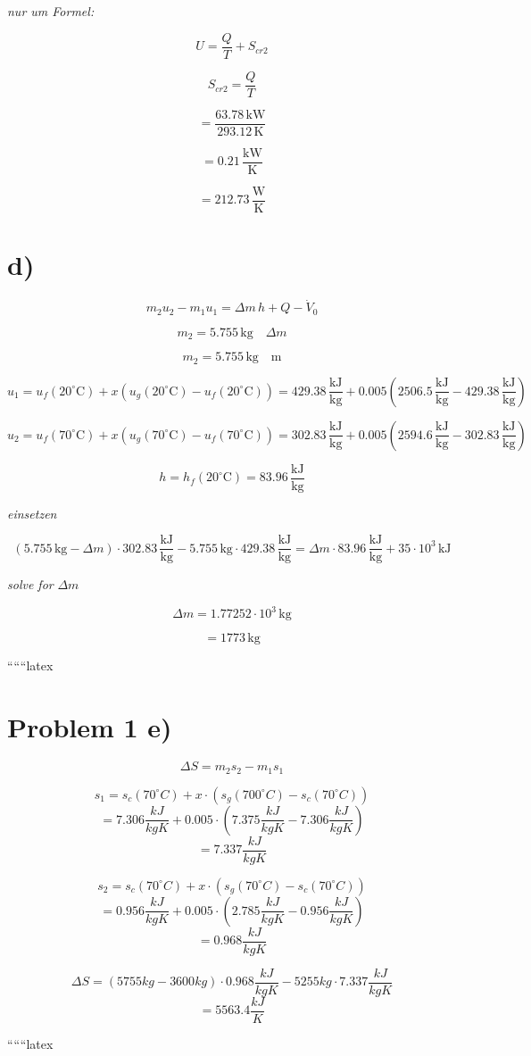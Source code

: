 \textit{nur um Formel:}

\[
U = \frac{Q}{T} + S_{cr2}
\]

\[
S_{cr2} = \frac{Q}{T}
\]

\[
= \frac{63.78 \, \text{kW}}{293.12 \, \text{K}}
\]

\[
= 0.21 \, \frac{\text{kW}}{\text{K}}
\]

\[
= 212.73 \, \frac{\text{W}}{\text{K}}
\]

\section*{d)}

\[
m_2 u_2 - m_1 u_1 = \Delta m \, h + Q - \dot{V}_0
\]

\[
m_2 = 5.755 \, \text{kg} \quad \Delta m
\]

\[
m_2 = 5.755 \, \text{kg} \quad \text{m}
\]

\[
u_1 = u_f (20^\circ \text{C}) + x (u_g (20^\circ \text{C}) - u_f (20^\circ \text{C})) = 429.38 \, \frac{\text{kJ}}{\text{kg}} + 0.005 (2506.5 \, \frac{\text{kJ}}{\text{kg}} - 429.38 \, \frac{\text{kJ}}{\text{kg}})
\]

\[
u_2 = u_f (70^\circ \text{C}) + x (u_g (70^\circ \text{C}) - u_f (70^\circ \text{C})) = 302.83 \, \frac{\text{kJ}}{\text{kg}} + 0.005 (2594.6 \, \frac{\text{kJ}}{\text{kg}} - 302.83 \, \frac{\text{kJ}}{\text{kg}})
\]

\[
h = h_f (20^\circ \text{C}) = 83.96 \, \frac{\text{kJ}}{\text{kg}}
\]

\textit{einsetzen}

\[
(5.755 \, \text{kg} - \Delta m) \cdot 302.83 \, \frac{\text{kJ}}{\text{kg}} - 5.755 \, \text{kg} \cdot 429.38 \, \frac{\text{kJ}}{\text{kg}} = \Delta m \cdot 83.96 \, \frac{\text{kJ}}{\text{kg}} + 35 \cdot 10^3 \, \text{kJ}
\]

\textit{solve for} \(\Delta m\)

\[
\Delta m = 1.77252 \cdot 10^3 \, \text{kg}
\]

\[
= 1773 \, \text{kg}
\]

``````latex


\section*{Problem 1 e)}

\[
\Delta S = m_2 s_2 - m_1 s_1
\]

\[
s_1 = s_c (70^\circ C) + x \cdot (s_g (700^\circ C) - s_c (70^\circ C))
\]
\[
= 7.306 \frac{kJ}{kgK} + 0.005 \cdot (7.375 \frac{kJ}{kgK} - 7.306 \frac{kJ}{kgK})
\]
\[
= 7.337 \frac{kJ}{kgK}
\]

\[
s_2 = s_c (70^\circ C) + x \cdot (s_g (70^\circ C) - s_c (70^\circ C))
\]
\[
= 0.956 \frac{kJ}{kgK} + 0.005 \cdot (2.785 \frac{kJ}{kgK} - 0.956 \frac{kJ}{kgK})
\]
\[
= 0.968 \frac{kJ}{kgK}
\]

\[
\Delta S = (5755 kg - 3600 kg) \cdot 0.968 \frac{kJ}{kgK} - 5255 kg \cdot 7.337 \frac{kJ}{kgK}
\]
\[
= 5563.4 \frac{kJ}{K}
\]

``````latex



